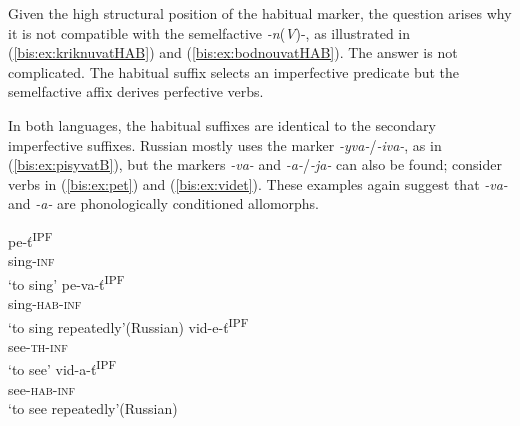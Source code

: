 \documentclass[output=paper]{langscibook}
\begin{document}
\z

\noindent Given the high structural position of the habitual marker, the question arises why it is not compatible with the semelfactive \textit{-n}(\textit{V})-, as illustrated in (\ref{bis:ex:kriknuvatHAB}) and (\ref{bis:ex:bodnouvatHAB}). The answer is not complicated. The habitual suffix selects an imperfective predicate but the semelfactive affix derives perfective verbs.

\z

\noindent In both languages, the habitual suffixes are identical to the secondary imperfective suffixes. Russian mostly uses the marker \textit{-yva-}/\textit{-iva-}, as in (\ref{bis:ex:pisyvatB}), but the markers \textit{-va-} and \textit{-a-}/\textit{-ja-} can also be found; consider verbs in (\ref{bis:ex:pet}) and (\ref{bis:ex:videt}). These examples again suggest that \textit{-va-} and \textit{-a-} are phonologically conditioned allomorphs.

\ea\label{bis:ex:pet}
\ea\label{bis:ex:petA} \gll 
pe-ť\textsuperscript{IPF} \\ 
sing-\textsc{inf} \\
\glt ‘to sing’
\ex\label{bis:ex:pevatB} \gll pe-va-ť\textsuperscript{IPF} \\
sing-\textsc{hab}-\textsc{inf} \\
\glt ‘to sing repeatedly’\hfill (Russian)
\z
\ex\label{bis:ex:videt}
\ea\label{bis:ex:videtA} \gll 
vid-e-ť\textsuperscript{IPF} \\ 
see-\textsc{th}-\textsc{inf} \\
\glt ‘to see’
\ex\label{bis:ex:vidatB} \gll vid-a-ť\textsuperscript{IPF} \\
see-\textsc{hab}-\textsc{inf} \\
\glt ‘to see repeatedly’\hfill (Russian)
\z
\z
\end{document}
